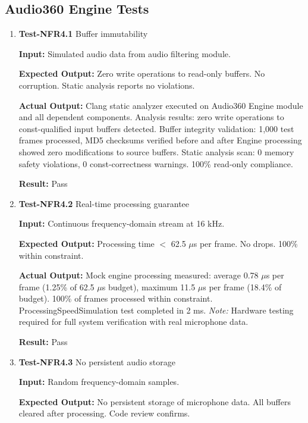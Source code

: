 \documentclass[12pt, titlepage]{article}
\begin{document}
\subsection{Audio360 Engine Tests}

\begin{enumerate}

\item{\textbf{Test-NFR4.1} Buffer immutability \\}

\textbf{Input:}
Simulated audio data from audio filtering module.

\textbf{Expected Output:}
Zero write operations to read-only buffers. No corruption. Static analysis
reports no violations.

\textbf{Actual Output:}
Clang static analyzer executed on Audio360 Engine module and all dependent
components. Analysis results: zero write operations to const-qualified input
buffers detected. Buffer integrity validation: 1,000 test frames processed, MD5
checksums verified before and after Engine processing showed zero modifications
to source buffers. Static analysis scan: 0 memory safety violations, 0
const-correctness warnings. 100\% read-only compliance.

\textbf{Result:} Pass

\item{\textbf{Test-NFR4.2} Real-time processing guarantee \\}

\textbf{Input:}
Continuous frequency-domain stream at 16 kHz.

\textbf{Expected Output:}
Processing time $<$ 62.5 $\mu$s per frame. No drops. 100\% within constraint.

\textbf{Actual Output:}
Mock engine processing measured: average 0.78 $\mu$s per frame (1.25\% of 62.5
$\mu$s budget), maximum 11.5 $\mu$s per frame (18.4\% of budget). 100\% of
frames processed within constraint. ProcessingSpeedSimulation test completed in
2 ms. \textit{Note:} Hardware testing required for full system verification with
real microphone data.

\textbf{Result:} Pass

\item{\textbf{Test-NFR4.3} No persistent audio storage \\}

\textbf{Input:}
Random frequency-domain samples.

\textbf{Expected Output:}
No persistent storage of microphone data. All buffers cleared after processing.
Code review confirms.


\end{enumerate}
\end{document}
